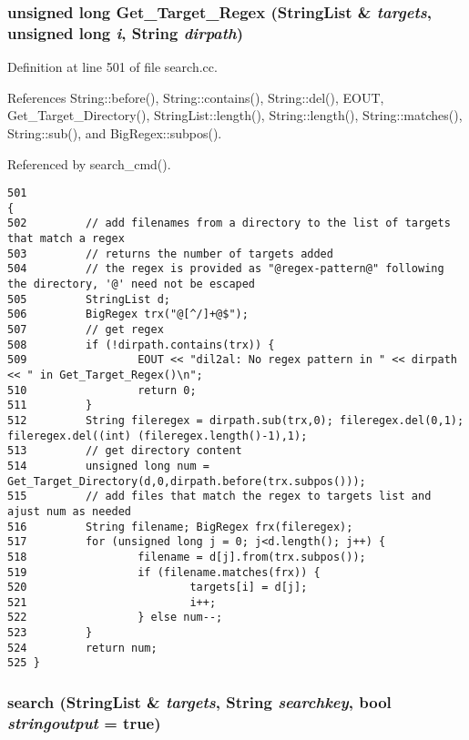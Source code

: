 \subsubsection{\setlength{\rightskip}{0pt plus 5cm}unsigned long Get\_\-Target\_\-Regex ({\bf String\-List} \& {\em targets}, unsigned long {\em i}, {\bf String} {\em dirpath})}\label{search_8cc_a4}




Definition at line 501 of file search.cc.

References String::before(), String::contains(), String::del(), EOUT, Get\_\-Target\_\-Directory(), String\-List::length(), String::length(), String::matches(), String::sub(), and Big\-Regex::subpos().

Referenced by search\_\-cmd().



\footnotesize\begin{verbatim}501                                                                                       {
502         // add filenames from a directory to the list of targets that match a regex
503         // returns the number of targets added
504         // the regex is provided as "@regex-pattern@" following the directory, '@' need not be escaped
505         StringList d;
506         BigRegex trx("@[^/]+@$");
507         // get regex
508         if (!dirpath.contains(trx)) {
509                 EOUT << "dil2al: No regex pattern in " << dirpath << " in Get_Target_Regex()\n";
510                 return 0;
511         }
512         String fileregex = dirpath.sub(trx,0); fileregex.del(0,1); fileregex.del((int) (fileregex.length()-1),1);
513         // get directory content
514         unsigned long num = Get_Target_Directory(d,0,dirpath.before(trx.subpos()));
515         // add files that match the regex to targets list and ajust num as needed
516         String filename; BigRegex frx(fileregex);
517         for (unsigned long j = 0; j<d.length(); j++) {
518                 filename = d[j].from(trx.subpos());
519                 if (filename.matches(frx)) {
520                         targets[i] = d[j];
521                         i++;
522                 } else num--;
523         }
524         return num;
525 }
\end{verbatim}\normalsize 
{}
\subsubsection{ search ({\bf String\-List} \& {\em targets}, {\bf String} {\em searchkey}, bool {\em stringoutput} = {\bf true})}\label{search_8cc_a2}




